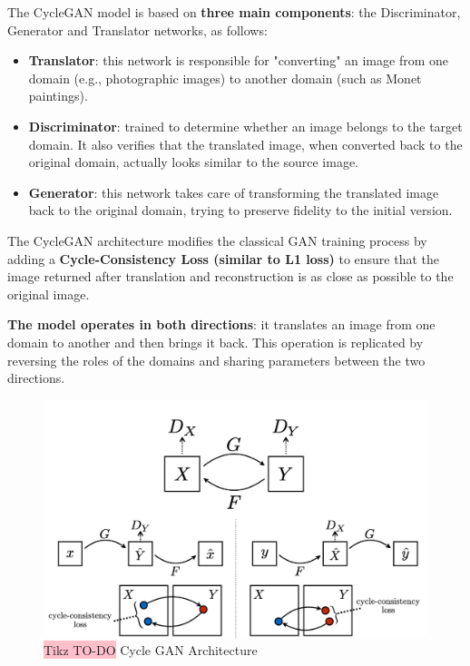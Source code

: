 The CycleGAN model is based on \textbf{three main components}: the Discriminator, Generator and Translator networks, as follows:

\begin{itemize}
\item \textbf{Translator}: this network is responsible for "converting" an image from one domain (e.g., photographic images) to another domain (such as Monet paintings).

\item \textbf{Discriminator}: trained to determine whether an image belongs to the target domain. It also verifies that the translated image, when converted back to the original domain, actually looks similar to the source image.

\item \textbf{Generator}: this network takes care of transforming the translated image back to the original domain, trying to preserve fidelity to the initial version.
\end{itemize}


The CycleGAN architecture modifies the classical GAN training process by adding a \textbf{Cycle-Consistency Loss (similar to L1 loss)} to ensure that the image returned after translation and reconstruction is as close as possible to the original image.

\textbf{The model operates in both directions}: it translates an image from one domain to another and then brings it back. This operation is replicated by reversing the roles of the domains and sharing parameters between the two directions.

\begin{figure}[!htbp]
    \centering
    \includegraphics[width=0.8\linewidth]{tikz/chapter9 - CycleGAN.png}
    \caption{{\color{red}\colorbox{pink}{Tikz TO-DO}} Cycle GAN Architecture}
\end{figure}


